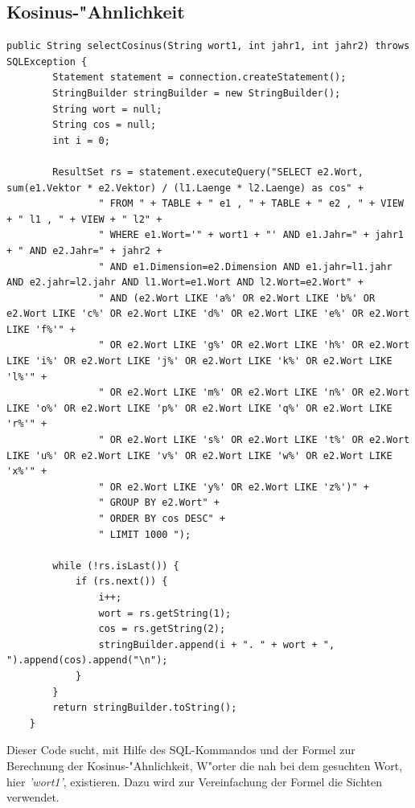 \subsection{Kosinus-"Ahnlichkeit}
\begin{lstlisting}[style=Java]
    public String selectCosinus(String wort1, int jahr1, int jahr2) throws SQLException {
        Statement statement = connection.createStatement();
        StringBuilder stringBuilder = new StringBuilder();
        String wort = null;
        String cos = null;
        int i = 0;

        ResultSet rs = statement.executeQuery("SELECT e2.Wort, sum(e1.Vektor * e2.Vektor) / (l1.Laenge * l2.Laenge) as cos" +
                " FROM " + TABLE + " e1 , " + TABLE + " e2 , " + VIEW + " l1 , " + VIEW + " l2" +
                " WHERE e1.Wort='" + wort1 + "' AND e1.Jahr=" + jahr1 + " AND e2.Jahr=" + jahr2 +
                " AND e1.Dimension=e2.Dimension AND e1.jahr=l1.jahr AND e2.jahr=l2.jahr AND l1.Wort=e1.Wort AND l2.Wort=e2.Wort" +
                " AND (e2.Wort LIKE 'a%' OR e2.Wort LIKE 'b%' OR e2.Wort LIKE 'c%' OR e2.Wort LIKE 'd%' OR e2.Wort LIKE 'e%' OR e2.Wort LIKE 'f%'" +
                " OR e2.Wort LIKE 'g%' OR e2.Wort LIKE 'h%' OR e2.Wort LIKE 'i%' OR e2.Wort LIKE 'j%' OR e2.Wort LIKE 'k%' OR e2.Wort LIKE 'l%'" +
                " OR e2.Wort LIKE 'm%' OR e2.Wort LIKE 'n%' OR e2.Wort LIKE 'o%' OR e2.Wort LIKE 'p%' OR e2.Wort LIKE 'q%' OR e2.Wort LIKE 'r%'" +
                " OR e2.Wort LIKE 's%' OR e2.Wort LIKE 't%' OR e2.Wort LIKE 'u%' OR e2.Wort LIKE 'v%' OR e2.Wort LIKE 'w%' OR e2.Wort LIKE 'x%'" +
                " OR e2.Wort LIKE 'y%' OR e2.Wort LIKE 'z%')" +
                " GROUP BY e2.Wort" +
                " ORDER BY cos DESC" +
                " LIMIT 1000 ");

        while (!rs.isLast()) {
            if (rs.next()) {
                i++;
                wort = rs.getString(1);
                cos = rs.getString(2);
                stringBuilder.append(i + ". " + wort + ", ").append(cos).append("\n");
            }
        }
        return stringBuilder.toString();
    }
\end{lstlisting}
Dieser Code sucht, mit Hilfe des SQL-Kommandos und der Formel zur Berechnung der Kosinus-"Ahnlichkeit, W"orter die nah bei dem gesuchten Wort, hier \textit{'wort1'}, existieren. Dazu wird zur Vereinfachung der Formel die Sichten verwendet.


